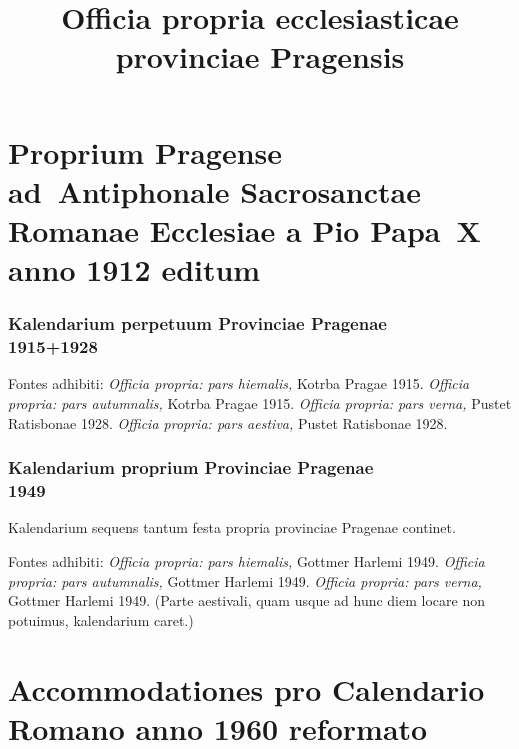 \documentclass[12pt, a5paper, twoside]{book}
\title{Officia propria ecclesiasticae provinciae Pragensis}
\begin{document}
\pagestyle{empty}

\setlength{\parindent}{0.5cm}

\maketitle

\cleardoublepage

\pagestyle{plain}



\part{Proprium Pragense ad~Antiphonale Sacrosanctae Romanae Ecclesiae
  a Pio Papa~X anno 1912 editum}

\section*{Kalendarium perpetuum Provinciae Pragenae\\1915+1928}

{\footnotesize
  Fontes adhibiti:
  \emph{Officia propria: pars hiemalis,} Kotrba Pragae 1915.
  \emph{Officia propria: pars autumnalis,} Kotrba Pragae 1915.
  \emph{Officia propria: pars verna,} Pustet Ratisbonae 1928.
  \emph{Officia propria: pars aestiva,} Pustet Ratisbonae 1928.
}


\cleardoublepage

\section*{Kalendarium proprium Provinciae Pragenae\\1949}

{\footnotesize
  Kalendarium sequens tantum festa propria provinciae Pragenae
  continet.

  Fontes adhibiti:
  \emph{Officia propria: pars hiemalis,} Gottmer Harlemi 1949.
  \emph{Officia propria: pars autumnalis,} Gottmer Harlemi 1949.
  \emph{Officia propria: pars verna,} Gottmer Harlemi 1949.
  (Parte aestivali, quam usque ad hunc diem locare non potuimus,
  kalendarium caret.)
}


\cleardoublepage



\vfill
\clearpage



\part{Accommodationes pro Calendario Romano anno 1960 reformato}
\end{document}
